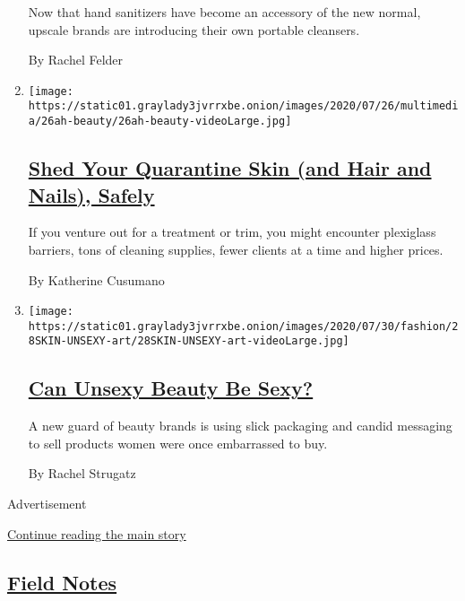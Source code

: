 \begin{enumerate}
  Now that hand sanitizers have become an accessory of the new normal,
  upscale brands are introducing their own portable cleansers.

  By Rachel Felder
\item
  \texttt{[image: https://static01.graylady3jvrrxbe.onion/images/2020/07/26/multimedia/26ah-beauty/26ah-beauty-videoLarge.jpg]}

  \hypertarget{shed-your-quarantine-skin-and-hair-and-nails-safely}{%
  \subsection{\texorpdfstring{\href{/2020/07/25/at-home/coronavirus-salons.html}{Shed
  Your Quarantine Skin (and Hair and Nails),
  Safely}}{Shed Your Quarantine Skin (and Hair and Nails), Safely}}\label{shed-your-quarantine-skin-and-hair-and-nails-safely}}

  If you venture out for a treatment or trim, you might encounter
  plexiglass barriers, tons of cleaning supplies, fewer clients at a
  time and higher prices.

  By Katherine Cusumano
\item
  \texttt{[image: https://static01.graylady3jvrrxbe.onion/images/2020/07/30/fashion/28SKIN-UNSEXY-art/28SKIN-UNSEXY-art-videoLarge.jpg]}

  \hypertarget{can-unsexy-beauty-be-sexy}{%
  \subsection{\texorpdfstring{\href{/2020/07/28/style/can-unsexy-beauty-be-sexy.html}{Can
  Unsexy Beauty Be
  Sexy?}}{Can Unsexy Beauty Be Sexy?}}\label{can-unsexy-beauty-be-sexy}}

  A new guard of beauty brands is using slick packaging and candid
  messaging to sell products women were once embarrassed to buy.

  By Rachel Strugatz
\end{enumerate}

Advertisement

\protect\hyperlink{after-mid3}{Continue reading the main story}

\hypertarget{field-notes-2}{%
\subsection{\texorpdfstring{\href{/column/field-notes}{Field
Notes}}{Field Notes}}\label{field-notes-2}}

